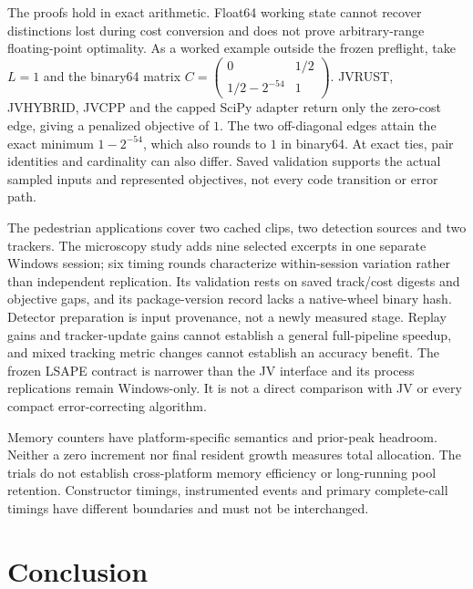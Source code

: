 \documentclass[11pt,a4paper]{article}
\begin{document}
The proofs hold in exact arithmetic. Float64 working state cannot recover distinctions lost during cost conversion and does not prove arbitrary-range floating-point optimality. As a worked example outside the frozen preflight, take \(L=1\) and the binary64 matrix \(C=\left(\begin{smallmatrix}0&1/2\\1/2-2^{-54}&1\end{smallmatrix}\right)\). JVRUST, JVHYBRID, JVCPP and the capped SciPy adapter return only the zero-cost edge, giving a penalized objective of \(1\). The two off-diagonal edges attain the exact minimum \(1-2^{-54}\), which also rounds to \(1\) in binary64. At exact ties, pair identities and cardinality can also differ. Saved validation supports the actual sampled inputs and represented objectives, not every code transition or error path.

The pedestrian applications cover two cached clips, two detection sources and two trackers. The microscopy study adds nine selected excerpts in one separate Windows session; six timing rounds characterize within-session variation rather than independent replication. Its validation rests on saved track/cost digests and objective gaps, and its package-version record lacks a native-wheel binary hash. Detector preparation is input provenance, not a newly measured stage. Replay gains and tracker-update gains cannot establish a general full-pipeline speedup, and mixed tracking metric changes cannot establish an accuracy benefit. The frozen LSAPE contract is narrower than the JV interface and its process replications remain Windows-only. It is not a direct comparison with JV or every compact error-correcting algorithm.

Memory counters have platform-specific semantics and prior-peak headroom. Neither a zero increment nor final resident growth measures total allocation. The trials do not establish cross-platform memory efficiency or long-running pool retention. Constructor timings, instrumented events and primary complete-call timings have different boundaries and must not be interchanged.

\FloatBarrier
\section{Conclusion}
\end{document}
